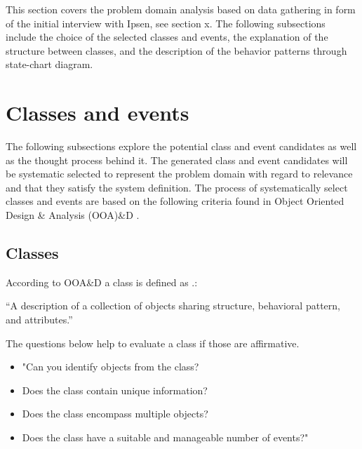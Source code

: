 This section covers the problem domain analysis based on data gathering in form of the initial interview with Ipsen, see section x.
The following subsections include the choice of the selected classes and events, the explanation of the structure between classes, and the description of the behavior patterns through state-chart diagram.

\section{Classes and events}
The following subsections explore the potential class and event candidates as well as the thought process behind it.
The generated class and event candidates will be systematic selected to represent the problem domain with regard to relevance and that they satisfy the system definition.
The process of systematically select classes and events are based on the following criteria found in Object Oriented Design \& Analysis (OOA)\&D \citep[p.~63-67]{Rod-Aalborg}.

\subsection{Classes}
According to OOA\&D a class is defined as \citep[p.~55]{Rod-Aalborg}.:

“A description of a collection of objects sharing structure, behavioral pattern, and attributes.”

The questions below help to evaluate a class if those are affirmative. \citep[p.~62]{Rod-Aalborg}
\begin{itemize}
	\item "Can you identify objects from the class?
	\item Does the class contain unique information?
	\item Does the class encompass multiple objects?
	\item Does the class have a suitable and manageable number of events?"
\end{itemize}

